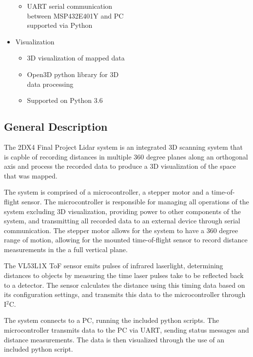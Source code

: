 \documentclass[12pt]{article}
\begin{document}
\begin{paracol}{2}
\begin{itemize}[nosep]
\begin{itemize}[nosep]
            \item UART serial communication\\ between MSP432E401Y and PC \\ supported via Python
        \end{itemize}
        \item Visualization
        \begin{itemize}[nosep]
            \item 3D visualization of mapped data
            \item Open3D python library for 3D\\ data processing
            \item Supported on Python 3.6
        \end{itemize}
    \end{itemize}
    \switchcolumn
    \subsection*{General Description}

    \indent \indent The 2DX4 Final Project Lidar system is an integrated 3D scanning system that is capble of recording distances in multiple 360 degree planes along an orthogonal axis and process the recorded data to produce a 3D visualization of the space that was mapped.

    The system is comprised of a microcontroller, a stepper motor and a time-of-flight sensor. The microcontroller is responsible for managing all operations of the system excluding 3D visualization, providing power to other components of the system, and transmitting all recorded data to an external device through serial communication. The stepper motor allows for the system to have a 360 degree range of motion, allowing for the mounted time-of-flight sensor to record distance measurements in the a full vertical plane.
    
    The VL53L1X ToF sensor emits pulses of infrared laserlight, determining distances to objects by measuring the time laser pulses take to be reflected back to a detector. The sensor calculates the distance using this timing data based on its configuration settings, and transmits this data to the microcontroller through I$^2$C.

    The system connects to a PC, running the included python scripts. The microcontroller transmits data to the PC via UART, sending status messages and distance measurements. The data is then visualized through the use of an included python script. \\
    

\end{paracol}
\end{document}
